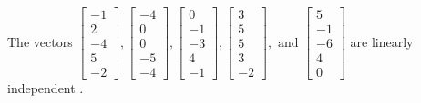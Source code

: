 \begin{exercise}
\begin{exerciseStatement}
  \end{exerciseStatement}
  \begin{exerciseAnswer}
   The vectors \(\left[\begin{array}{r}
-1 \\
2 \\
-4 \\
5 \\
-2
\end{array}\right] , \left[\begin{array}{r}
-4 \\
0 \\
0 \\
-5 \\
-4
\end{array}\right] , \left[\begin{array}{r}
0 \\
-1 \\
-3 \\
4 \\
-1
\end{array}\right] , \left[\begin{array}{r}
3 \\
5 \\
5 \\
3 \\
-2
\end{array}\right] , \text{ and } \left[\begin{array}{r}
5 \\
-1 \\
-6 \\
4 \\
0
\end{array}\right]\) are 
  	 linearly independent  .
  


  \end{exerciseAnswer}
\end{exercise}